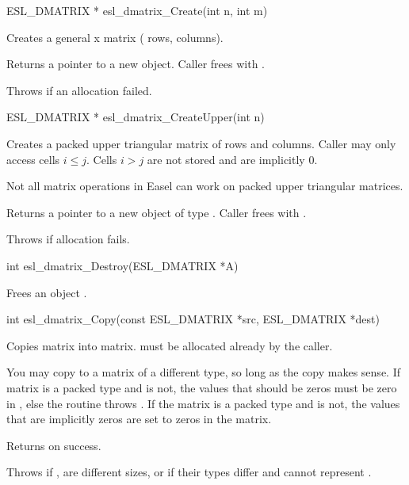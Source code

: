 \begin{sreapi}
\hypertarget{func:esl_dmatrix_Create()}
{\item[ESL\_DMATRIX * esl\_dmatrix\_Create(int n, int m)]}

Creates a general  x  matrix ( rows,  
columns).

Returns a pointer to a new  object. Caller frees
with .

Throws  if an allocation failed.


\hypertarget{func:esl_dmatrix_CreateUpper()}
{\item[ESL\_DMATRIX * esl\_dmatrix\_CreateUpper(int n)]}

Creates a packed upper triangular matrix of  rows and
 columns. Caller may only access cells $i \leq j$.
Cells $i > j$ are not stored and are implicitly 0.

Not all matrix operations in Easel can work on packed
upper triangular matrices.

Returns a pointer to a new  object of type
. Caller frees with .

Throws  if allocation fails.



\hypertarget{func:esl_dmatrix_Destroy()}
{\item[int esl\_dmatrix\_Destroy(ESL\_DMATRIX *A)]}

Frees an  object .


\hypertarget{func:esl_dmatrix_Copy()}
{\item[int esl\_dmatrix\_Copy(const ESL\_DMATRIX *src, ESL\_DMATRIX *dest)]}

Copies  matrix into  matrix.  must
be allocated already by the caller.

You may copy to a matrix of a different type, so long as
the copy makes sense. If  matrix is a packed type
and  is not, the values that should be zeros must
be zero in , else the routine throws
. If the  matrix is a packed type and
 is not, the values that are implicitly zeros are
set to zeros in the  matrix.

Returns  on success.

Throws  if ,  are different sizes,
or if their types differ and  cannot represent
.



\end{sreapi}
